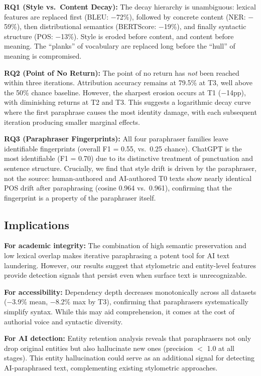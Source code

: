 \documentclass[10pt,twocolumn]{article}
\begin{document}
\textbf{RQ1 (Style vs.\ Content Decay):} The decay hierarchy is
unambiguous: lexical features are replaced first (BLEU: $-$72\%), followed
by concrete content (NER: $-$59\%), then distributional semantics
(BERTScore: $-$19\%), and finally syntactic structure (POS: $-$13\%).
Style is eroded before content, and content before meaning. The ``planks''
of vocabulary are replaced long before the ``hull'' of meaning is
compromised.

\textbf{RQ2 (Point of No Return):} The point of no return has
\emph{not} been reached within three iterations. Attribution accuracy
remains at 79.5\% at T3, well above the 50\% chance baseline.
However, the sharpest erosion occurs at T1 ($-$14pp), with diminishing
returns at T2 and T3. This suggests a logarithmic decay curve where
the first paraphrase causes the most identity damage, with each
subsequent iteration producing smaller marginal effects.

\textbf{RQ3 (Paraphraser Fingerprints):} All four paraphraser families
leave identifiable fingerprints (overall F1 = 0.55, vs.\ 0.25 chance).
ChatGPT is the most identifiable (F1 = 0.70) due to its distinctive
treatment of punctuation and sentence structure. Crucially, we find
that style drift is driven by the paraphraser, not the source: human-authored
and AI-authored T0 texts show nearly identical POS drift after paraphrasing
(cosine 0.964 vs.\ 0.961), confirming that the fingerprint is a property
of the paraphraser itself.

\subsection{Implications}

\textbf{For academic integrity:} The combination of high semantic
preservation and low lexical overlap makes iterative paraphrasing a potent
tool for AI text laundering. However, our results suggest that
stylometric and entity-level features provide detection signals that
persist even when surface text is unrecognizable.

\textbf{For accessibility:} Dependency depth decreases monotonically
across all datasets ($-$3.9\% mean, $-$8.2\% max by T3), confirming
that paraphrasers systematically simplify syntax. While this may aid
comprehension, it comes at the cost of authorial voice and syntactic
diversity.

\textbf{For AI detection:} Entity retention analysis reveals that
paraphrasers not only drop original entities but also hallucinate
new ones (precision $<$ 1.0 at all stages). This entity hallucination
could serve as an additional signal for detecting AI-paraphrased text,
complementing existing stylometric approaches.
\end{document}
